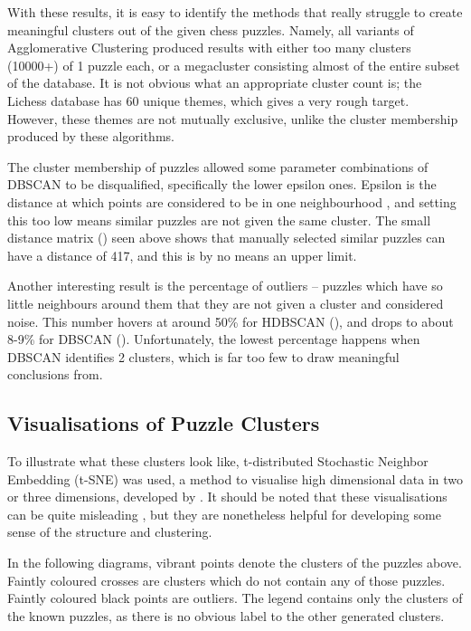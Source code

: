 With these results, it is easy to identify the methods that really struggle to
create meaningful clusters out of the given chess puzzles. Namely, all variants
of Agglomerative Clustering produced results with either too many clusters
(10000+) of 1 puzzle each, or a megacluster consisting almost of the entire
subset of the database. It is not obvious what an appropriate cluster count is;
the Lichess database has 60 unique themes, which gives a very rough target.
However, these themes are not mutually exclusive, unlike the cluster membership
produced by these algorithms. 

The cluster membership of puzzles allowed some parameter combinations of DBSCAN
to be disqualified, specifically the lower epsilon ones. Epsilon is the
distance at which points are considered to be in one neighbourhood
\citep{dbscan}, and setting this too low means similar puzzles are not given
the same cluster. The small distance matrix () seen
above shows that manually selected similar puzzles can have a distance of 417,
and this is by no means an upper limit.

Another interesting result is the percentage of outliers -- puzzles which have
so little neighbours around them that they are not given a cluster and
considered noise. This number hovers at around 50\% for HDBSCAN
(), and drops to about 8-9\% for DBSCAN ().
Unfortunately, the lowest percentage happens when DBSCAN identifies 2 clusters,
which is far too few to draw meaningful conclusions from.

\subsection{Visualisations of Puzzle Clusters}\label{treeS23}

To illustrate what these clusters look like, t-distributed Stochastic Neighbor
Embedding (t-SNE) was used, a method to visualise high dimensional data in two
or three dimensions, developed by \citet{tsne}. It should be noted that these
visualisations can be quite misleading \citep{wattenberg2016how}, but they are
nonetheless helpful for developing some sense of the structure and clustering.

In the following diagrams, vibrant points denote the clusters of the puzzles
above. Faintly coloured crosses are clusters which do not contain any of those
puzzles. Faintly coloured black points are outliers. The legend contains only
the clusters of the known puzzles, as there is no obvious label to the other
generated clusters.

